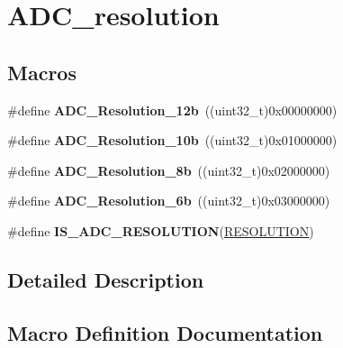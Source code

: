 \hypertarget{group___a_d_c__resolution}{}\section{A\+D\+C\+\_\+resolution}
\label{group___a_d_c__resolution}
\subsection*{Macros}
\begin{DoxyCompactItemize}
\item 
\#define {\bfseries A\+D\+C\+\_\+\+Resolution\+\_\+12b}~((uint32\+\_\+t)0x00000000)\hypertarget{group___a_d_c__resolution_gac75d52ba1d748fa0b62da488490d98d0}{}\label{group___a_d_c__resolution_gac75d52ba1d748fa0b62da488490d98d0}

\item 
\#define {\bfseries A\+D\+C\+\_\+\+Resolution\+\_\+10b}~((uint32\+\_\+t)0x01000000)\hypertarget{group___a_d_c__resolution_ga783949335d175a2c32cdf46e1313ddac}{}\label{group___a_d_c__resolution_ga783949335d175a2c32cdf46e1313ddac}

\item 
\#define {\bfseries A\+D\+C\+\_\+\+Resolution\+\_\+8b}~((uint32\+\_\+t)0x02000000)\hypertarget{group___a_d_c__resolution_ga79f3c525ef11971c3b8287f6a4a2307d}{}\label{group___a_d_c__resolution_ga79f3c525ef11971c3b8287f6a4a2307d}

\item 
\#define {\bfseries A\+D\+C\+\_\+\+Resolution\+\_\+6b}~((uint32\+\_\+t)0x03000000)\hypertarget{group___a_d_c__resolution_gacda91713c1e31de3142a86e3e1714e97}{}\label{group___a_d_c__resolution_gacda91713c1e31de3142a86e3e1714e97}

\item 
\#define {\bfseries I\+S\+\_\+\+A\+D\+C\+\_\+\+R\+E\+S\+O\+L\+U\+T\+I\+ON}(\hyperlink{main_8c_a97448ce2ad00bb6a1d9ddaaf7dd15e35}{R\+E\+S\+O\+L\+U\+T\+I\+ON})
\end{DoxyCompactItemize}


\subsection{Detailed Description}


\subsection{Macro Definition Documentation}

